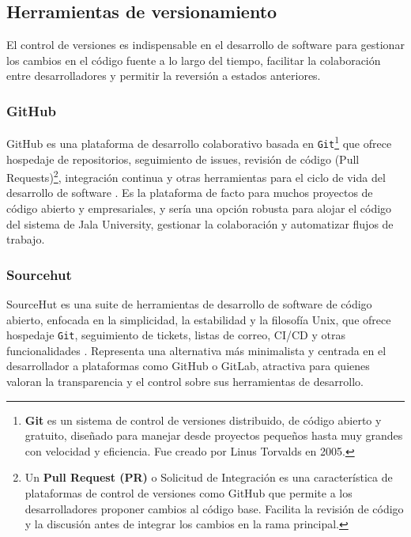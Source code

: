 \subsection{Herramientas de versionamiento}
El control de versiones es indispensable en el desarrollo de software para gestionar los cambios en el código fuente a lo largo del tiempo, facilitar la colaboración entre desarrolladores y permitir la reversión a estados anteriores.

\subsubsection{GitHub}
GitHub es una plataforma de desarrollo colaborativo basada en \texttt{Git}\footnote{\textbf{Git} es un sistema de control de versiones distribuido, de código abierto y gratuito, diseñado para manejar desde proyectos pequeños hasta muy grandes con velocidad y eficiencia.
Fue creado por Linus Torvalds en 2005.} que ofrece hospedaje de repositorios, seguimiento de issues, revisión de código (Pull Requests)\footnote{Un \textbf{Pull Request (PR)} o Solicitud de Integración es una característica de plataformas de control de versiones como GitHub que permite a los desarrolladores proponer cambios al código base.
Facilita la revisión de código y la discusión antes de integrar los cambios en la rama principal.}, integración continua y otras herramientas para el ciclo de vida del desarrollo de software \parencite{GitHub}.
Es la plataforma de facto para muchos proyectos de código abierto y empresariales, y sería una opción robusta para alojar el código del sistema de Jala University, gestionar la colaboración y automatizar flujos de trabajo.

\subsubsection{Sourcehut}
SourceHut es una suite de herramientas de desarrollo de software de código abierto, enfocada en la simplicidad, la estabilidad y la filosofía Unix, que ofrece hospedaje \texttt{Git}, seguimiento de tickets, listas de correo, CI/CD y otras funcionalidades \parencite{SourceHut}.
Representa una alternativa más minimalista y centrada en el desarrollador a plataformas como GitHub o GitLab, atractiva para quienes valoran la transparencia y el control sobre sus herramientas de desarrollo.

